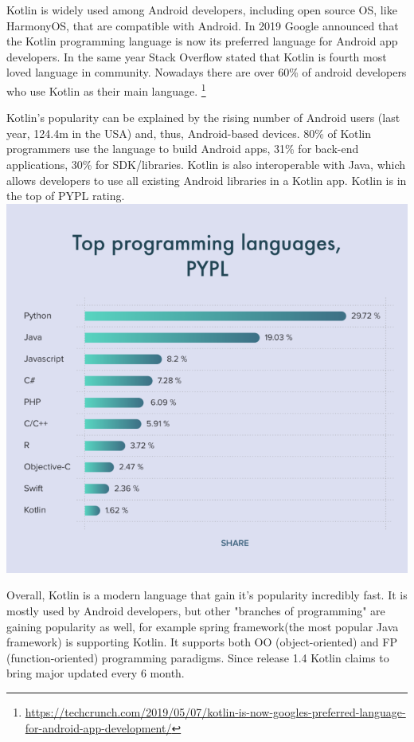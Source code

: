 Kotlin is widely used among Android developers, including open source OS, like HarmonyOS, that are compatible with Android. In 2019 Google announced that the Kotlin programming language is now its preferred language for Android app developers. In the same year Stack Overflow stated that Kotlin is fourth most loved language in community. Nowadays there are over 60\% of android developers who use Kotlin as their main language. \footnote{\url{https://techcrunch.com/2019/05/07/kotlin-is-now-googles-preferred-language-for-android-app-development/}}
\par Kotlin's popularity can be explained by the rising number of Android users (last year, 124.4m in the USA) and, thus, Android-based devices. 80\% of Kotlin programmers use the language to build Android apps, 31\% for back-end applications, 30\% for SDK/libraries.
Kotlin is also interoperable with Java, which allows developers to use all existing Android libraries in a Kotlin app. Kotlin is in the top of PYPL rating.
\newline
\includegraphics[scale = 0.5]{pictures/kotlinRating.png}
\newline
\par Overall, Kotlin is a modern language that gain it's popularity incredibly fast. It is mostly used by Android developers, but other "branches of programming" are gaining popularity as well, for example spring framework(the most popular Java framework) is supporting Kotlin. It supports both OO (object-oriented) and FP (function-oriented) programming paradigms. Since release 1.4 Kotlin claims to bring major updated every 6 month.